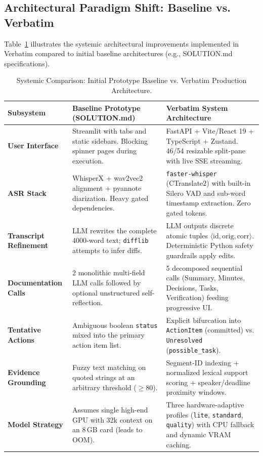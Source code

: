 \documentclass[10pt,a4paper]{article}
\begin{document}
\subsection{Architectural Paradigm Shift: Baseline vs. Verbatim}
Table~\ref{tab:comparison_paradigm} illustrates the systemic architectural improvements implemented in Verbatim compared to initial baseline architectures (e.g., SOLUTION.md specifications).

\begin{table}[t]
\centering
\caption{Systemic Comparison: Initial Prototype Baseline vs. Verbatim Production Architecture.}
\label{tab:comparison_paradigm}
\small
\begin{tabularx}{\textwidth}{p{3.2cm}X X}
\toprule
\textbf{Subsystem} & \textbf{Baseline Prototype (SOLUTION.md)} & \textbf{Verbatim System Architecture} \\
\midrule
\textbf{User Interface} & Streamlit with tabs and static sidebars. Blocking spinner pages during execution. & FastAPI + Vite/React 19 + TypeScript + Zustand. 46/54 resizable split-pane with live SSE streaming. \\
\textbf{ASR Stack} & WhisperX + wav2vec2 alignment + pyannote diarization. Heavy gated dependencies. & \texttt{faster-whisper} (CTranslate2) with built-in Silero VAD and sub-word timestamp extraction. Zero gated tokens. \\
\textbf{Transcript Refinement} & LLM rewrites the complete 4000-word text; \texttt{difflib} attempts to infer diffs. & LLM outputs discrete atomic tuples $\langle \text{id}, \text{orig}, \text{corr} \rangle$. Deterministic Python safety guardrails apply edits. \\
\textbf{Documentation Calls} & 2 monolithic multi-field LLM calls followed by optional unstructured self-reflection. & 5 decomposed sequential calls (Summary, Minutes, Decisions, Tasks, Verification) feeding progressive UI. \\
\textbf{Tentative Actions} & Ambiguous boolean \texttt{status} mixed into the primary action item list. & Explicit bifurcation into \texttt{ActionItem} (committed) vs. \texttt{Unresolved} (\texttt{possible\_task}). \\
\textbf{Evidence Grounding} & Fuzzy text matching on quoted strings at an arbitrary threshold ($\ge 80$). & Segment-ID indexing + normalized lexical support scoring + speaker/deadline proximity windows. \\
\textbf{Model Strategy} & Assumes single high-end GPU with 32k context on an 8\,GB card (leads to OOM). & Three hardware-adaptive profiles (\texttt{lite}, \texttt{standard}, \texttt{quality}) with CPU fallback and dynamic VRAM caching. \\
\bottomrule
\end{tabularx}
\end{table}
\end{document}
